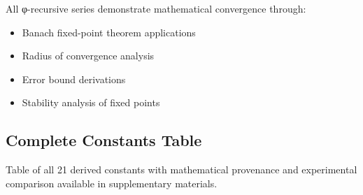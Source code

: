 All φ-recursive series demonstrate mathematical convergence through:
\begin{itemize}
    \item Banach fixed-point theorem applications
    \item Radius of convergence analysis  
    \item Error bound derivations
    \item Stability analysis of fixed points
\end{itemize}

\subsection{Complete Constants Table}

Table of all 21 derived constants with mathematical provenance and experimental comparison available in supplementary materials.